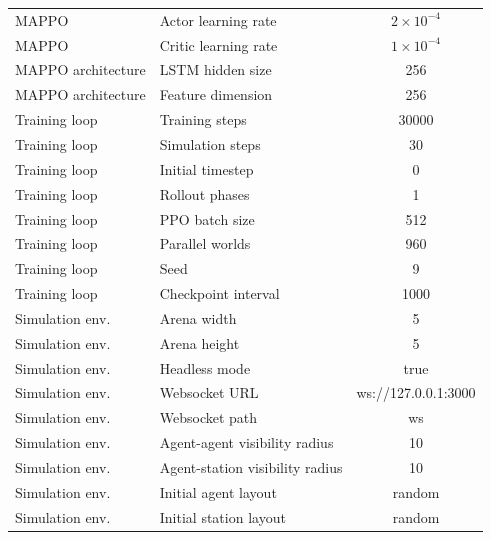 {\begin{longtable}{llc}
    MAPPO & Actor learning rate & $2\times 10^{-4}$ \\
    MAPPO & Critic learning rate & $1\times 10^{-4}$ \\
    MAPPO architecture & LSTM hidden size & 256 \\
    MAPPO architecture & Feature dimension & 256 \\
    \midrule
    Training loop & Training steps & 30000 \\
    Training loop & Simulation steps & 30 \\
    Training loop & Initial timestep & 0 \\
    Training loop & Rollout phases & 1 \\
    Training loop & PPO batch size & 512 \\
    Training loop & Parallel worlds & 960 \\
    Training loop & Seed & 9 \\
    Training loop & Checkpoint interval & 1000 \\
    \midrule
    Simulation env. & Arena width & 5 \\
    Simulation env. & Arena height & 5 \\
    Simulation env. & Headless mode & true \\
    Simulation env. & Websocket URL & ws://127.0.0.1:3000 \\
    Simulation env. & Websocket path & ws \\
    Simulation env. & Agent-agent visibility radius & 10 \\
    Simulation env. & Agent-station visibility radius & 10 \\
    Simulation env. & Initial agent layout & random \\
    Simulation env. & Initial station layout & random \\
    \bottomrule

\end{longtable}
}
